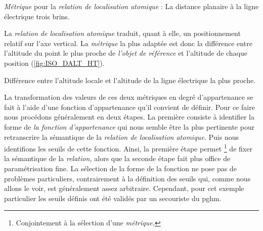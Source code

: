 \begin{carte}
  \centering
  
  \caption{\emph{Métrique} pour la \emph{relation de localisation
      atomique}    \protect{}
    : La distance planaire à la ligne électrique trois brins.}
  \label{fig:ISO_DIST_HT}
\end{carte}

La \emph{relation de localisation atomique}
 traduit,
quant à elle, un positionnement relatif sur l'axe vertical. La
\emph{métrique} la plus adaptée est donc la différence entre
l'altitude du point le plus proche de \emph{l'objet de référence} et
l'altitude de chaque position (\autoref{fig:ISO_DALT_HT}).

\begin{carte}
  \centering
  
  \caption{Différence entre l'altitude locale et l'altitude de la
    ligne électrique la plus proche.}
  \label{fig:ISO_DALT_HT}
\end{carte}

La transformation des valeurs de ces deux métriques en degré
d'appartenance se fait à l'aide d'une fonction d'appartenance qu'il
convient de définir. Pour ce faire nous procédons généralement en deux
étapes. La première consiste à identifier la forme de \emph{la
  fonction d'appartenance} qui nous semble être la plus pertinente
pour retranscrire la sémantique de la \emph{relation de localisation
  atomique.} Puis nous identifions les seuils de cette
fonction. Ainsi, la première étape permet \footnote{Conjointement à la
  sélection d'une \emph{métrique.}} de fixer la sémantique de la
\emph{relation,} alors que la seconde étape fait plus office de
paramétrisation fine. La sélection de la forme de la fonction ne pose
pas de problèmes particuliers, contrairement à la définition des
seuils qui, comme nous allons le voir, est généralement assez
arbitraire. Cependant, pour cet exemple particulier les seuils définis
ont été validés par un secouriste du \ac{pghm}.


